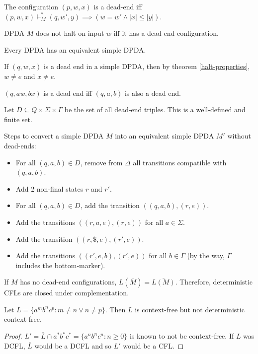 \begin{definition}
The configuration $(p, w, x)$ is a dead-end iff
$(p, w, x) \vdash_M^* (q, w', y) \implies (w = w' \wedge |x| \le |y|)$.
\end{definition}

\begin{theorem}
DPDA $M$ does not halt on input $w$ iff it has a dead-end configuration.
\end{theorem}

\begin{theorem}
Every DPDA has an equivalent simple DPDA.
\end{theorem}

If $(q, w, x)$ is a dead end in a simple DPDA, then by theorem \ref{halt-properties},
$w \neq e$ and $x \neq e$.
\begin{theorem}
$(q, aw, bx)$ is a dead end iff $(q, a, b)$ is also a dead end.
\end{theorem}

Let $D \subseteq Q \times \Sigma \times \Gamma$ be the set of all dead-end triples.
This is a well-defined and finite set.

Steps to convert a simple DPDA $M$ into an equivalent simple DPDA $M'$ without dead-ends:
\begin{itemize}
\item For all $(q, a, b) \in D$, remove from $\Delta$ all transitions compatible with $(q, a, b)$.
\item Add 2 non-final states $r$ and $r'$.
\item For all $(q, a, b) \in D$, add the transition $((q, a, b), (r, e))$.
\item Add the transitions $((r, a, e), (r, e))$ for all $a \in \Sigma$.
\item Add the transition $((r, \$, e), (r', e))$.
\item Add the transitions $((r', e, b), (r', e))$ for all $b \in \Gamma$
    (by the way, $\Gamma$ includes the bottom-marker).
\end{itemize}

If $M$ has no dead-end configurations, $L(\overline{M}) = \overline{L(M)}$.
Therefore, deterministic CFLs are closed under complementation.

\begin{theorem}
Let $L = \{a^mb^nc^p: m \neq n \vee n \neq p\}$. Then $L$ is context-free but not deterministic context-free.
\end{theorem}
\begin{proof}
$L' = \overline{L}\cap a^*b^*c^* = \{a^nb^nc^n: n \ge 0\}$ is known to not be context-free.
If $L$ was DCFL, $\overline{L}$ would be a DCFL and so $L'$ would be a CFL.
\end{proof}

